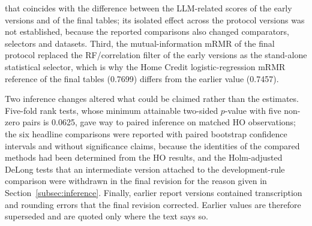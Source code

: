 \documentclass[final,5p,twocolumn]{elsarticle}
\begin{document}
that coincides with the difference between the LLM-related scores of the early versions and of the final tables; its isolated effect across the protocol versions was not established, because the reported comparisons also changed comparators, selectors and datasets. Third, the mutual-information mRMR of the final protocol replaced the RF/correlation filter of the early versions as the stand-alone statistical selector, which is why the Home Credit logistic-regression mRMR reference of the final tables (0.7699) differs from the earlier value (0.7457).

Two inference changes altered what could be claimed rather than the estimates. Five-fold rank tests, whose minimum attainable two-sided $p$-value with five non-zero pairs is 0.0625, gave way to paired inference on matched HO observations; the six headline comparisons were reported with paired bootstrap confidence intervals and without significance claims, because the identities of the compared methods had been determined from the HO results, and the Holm-adjusted DeLong tests that an intermediate version attached to the development-rule comparison were withdrawn in the final revision for the reason given in Section~\ref{subsec:inference}. Finally, earlier report versions contained transcription and rounding errors that the final revision corrected. Earlier values are therefore superseded and are quoted only where the text says so.
\end{document}
